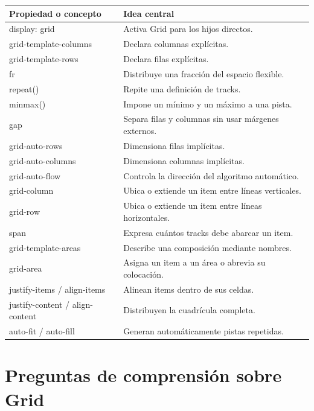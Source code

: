 \documentclass[11pt]{article}
\begin{document}
\begin{center}
\begin{tabularx}{0.99\linewidth}{>{\ttfamily}p{7.2cm}X}
\toprule
\textnormal{Propiedad o concepto} & \textnormal{Idea central} \\
\midrule
display: grid & Activa Grid para los hijos directos. \\
grid-template-columns & Declara columnas explícitas. \\
grid-template-rows & Declara filas explícitas. \\
fr & Distribuye una fracción del espacio flexible. \\
repeat() & Repite una definición de tracks. \\
minmax() & Impone un mínimo y un máximo a una pista. \\
gap & Separa filas y columnas sin usar márgenes externos. \\
grid-auto-rows & Dimensiona filas implícitas. \\
grid-auto-columns & Dimensiona columnas implícitas. \\
grid-auto-flow & Controla la dirección del algoritmo automático. \\
grid-column & Ubica o extiende un item entre líneas verticales. \\
grid-row & Ubica o extiende un item entre líneas horizontales. \\
span & Expresa cuántos tracks debe abarcar un item. \\
grid-template-areas & Describe una composición mediante nombres. \\
grid-area & Asigna un item a un área o abrevia su colocación. \\
justify-items / align-items & Alinean items dentro de sus celdas. \\
justify-content / align-content & Distribuyen la cuadrícula completa. \\
auto-fit / auto-fill & Generan automáticamente pistas repetidas. \\
\bottomrule
\end{tabularx}
\end{center}

\section{Preguntas de comprensión sobre Grid}
\end{document}
